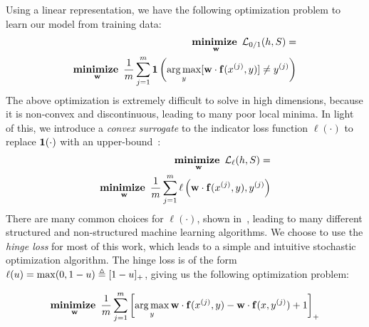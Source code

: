 Using a linear representation, we have the following optimization problem to learn our model from training data:
\begin{align}
\mathop{\mathbf{minimize~}}_{\mathbf{w}} \mathcal{L}_{0/1}(h,S) = \\ \mathop{\mathbf{minimize~}}_{\mathbf{w}} \frac{1}{m}\sum_{j=1}^m \mathbf{1}\left( \mathop{\arg\max}_y [\mathbf{w} \cdot \mathbf{f}(x^{(j)},y)] \neq y^{(j)}\right)
\end{align}
The above optimization is extremely difficult to solve in high dimensions, because it is non-convex and discontinuous, leading to many poor local minima.  In light of this, we introduce a {\em convex surrogate} to the indicator loss function $\ell(\cdot)$ to replace $\mathbf{1}(\cdot)$ with an upper-bound~\citep{bishop-book}:
\begin{align}
\mathop{\mathbf{minimize~}}_{\mathbf{w}} \mathcal{L}_{\ell}(h,S) = \\ \mathop{\mathbf{minimize~}}_{\mathbf{w}} \frac{1}{m}\sum_{j=1}^m \ell\left( \mathbf{w} \cdot \mathbf{f}(x^{(j)},y), y^{(j)}\right)
\end{align}
There are many common choices for $\ell(\cdot)$, shown in~, 
leading to many different structured and non-structured machine learning 
algorithms.  We choose to use the {\em hinge loss} for most of this work, which 
leads to a simple and intuitive stochastic optimization algorithm.  The hinge 
loss is of the form $\ell(u) = \max (0,1-u) \triangleq [1-u]_+$, giving us the 
following optimization problem:

\begin{align}
\mathop{\mathbf{minimize~}}_{\mathbf{w}} \frac{1}{m}\sum_{j=1}^m \left[ \mathop{\arg\max}_y \mathbf{w} \cdot \mathbf{f}(x^{(j)},y) - \mathbf{w} \cdot \mathbf{f}(x,y^{(j)}) + 1\right]_+
\end{align}


